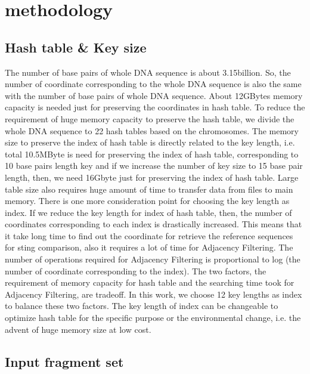 \section{methodology} \label{sec:methodology}

\subsection{Hash table \& Key size} \label{sec:method_hash} 

The number of base pairs of whole DNA sequence is about 3.15billion. So, the
number of coordinate corresponding to the whole DNA sequence is also the same
with the number of base pairs of whole DNA sequence.  About 12GBytes memory
capacity is needed just for preserving the coordinates in hash table. To reduce
the requirement of huge memory capacity to preserve the hash table, we divide
the whole DNA sequence to 22 hash tables based on the chromosomes. The memory
size to preserve the index of hash table is directly related to the key length,
i.e. total 10.5MByte is need for preserving the index of hash table,
corresponding to 10 base pairs length key and if we increase the number of key
size to 15 base pair length, then, we need 16Gbyte just for preserving the
index of hash table. Large table size also requires huge amount of time to
transfer data from files to main memory.  There is one more consideration point
for choosing the key length as index. If we reduce the key length for index of
hash table, then, the number of coordinates corresponding to each index is
drastically increased.  This means that it take long time to find out the
coordinate for retrieve the reference sequences for sting comparison, also it
requires a lot of time for Adjacency Filtering. The number of operations
required for Adjacency Filtering is proportional to log (the number of
coordinate corresponding to the index).  
The two factors, the requirement of memory capacity for hash table and the
searching time took for Adjacency Filtering, are tradeoff. In this work, we
choose 12 key lengths as index to balance these two factors. The key length of
index can be changeable to optimize hash table for the specific purpose or the
environmental change, i.e. the advent of huge memory size at low cost.\\

\subsection{Input fragment set} \label{sec:medhod_input}

